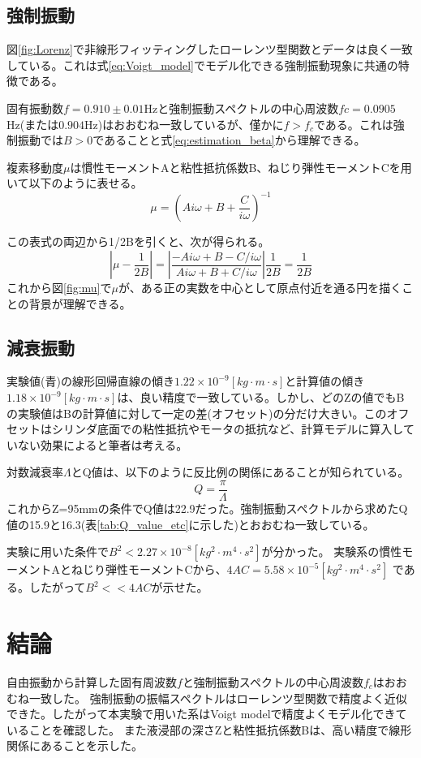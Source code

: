 \documentclass[11pt,a4]{jarticle}
\begin{document}
\subsection{強制振動}
図\ref{fig:Lorenz}で非線形フィッティングしたローレンツ型関数とデータは良く一致している。これは式\ref{eq:Voigt_model}でモデル化できる強制振動現象に共通の特徴である。

固有振動数$f=0.910 \pm 0.01$Hzと強制振動スペクトルの中心周波数$fc=0.0905$Hz(または$0.904$Hz)はおおむね一致しているが、僅かに$f>f_c$である。これは強制振動では$B>0$であることと式\ref{eq:estimation_beta}から理解できる。

複素移動度$\mu$は慣性モーメントAと粘性抵抗係数B、ねじり弾性モーメントCを用いて以下のように表せる。
\begin{equation}
\mu = ( Ai \omega + B + \frac{C}{i \omega} ) ^{-1} 
\label{eq:mu}
\end{equation}

この表式の両辺から1/2Bを引くと、次が得られる。
\begin{equation}
|\mu - \frac{1}{2B}| = | \frac{ - Ai \omega + B - C/i \omega}{ Ai \omega + B + C/i \omega}| \frac{1}{2B} = \frac{1}{2B} 
\label{eq:circle}
\end{equation}
これから図\ref{fig:mu}で$\mu$が、ある正の実数を中心として原点付近を通る円を描くことの背景が理解できる。

\subsection{減衰振動}
実験値(青)の線形回帰直線の傾き$1.22\times10^{-9} [kg\cdot m \cdot s]$と計算値の傾き$1.18\times10^{-9} [kg\cdot m \cdot s]$は、良い精度で一致している。しかし、どのZの値でもBの実験値はBの計算値に対して一定の差(オフセット)の分だけ大きい。このオフセットはシリンダ底面での粘性抵抗やモータの抵抗など、計算モデルに算入していない効果によると筆者は考える。

対数減衰率$\Lambda$とQ値は、以下のように反比例の関係にあることが知られている。
\begin{equation}
Q =  \frac{\pi}{\Lambda}
\label{eq:B}
\end{equation}
これからZ=95mmの条件でQ値は22.9だった。強制振動スペクトルから求めたQ値の15.9と16.3(表\ref{tab:Q_value_etc}に示した)とおおむね一致している。

実験に用いた条件で$B^2 < 2.27\times10^{-8} [kg^2 \cdot m^4 \cdot s^2] $が分かった。
実験系の慣性モーメントAとねじり弾性モーメントCから、$4AC= 5.58\times10^{-5} [kg^2 \cdot m^4 \cdot s^2]$ である。したがって$B^2<<4AC$が示せた。

\section{結論}
自由振動から計算した固有周波数$f$と強制振動スペクトルの中心周波数$f_c$はおおむね一致した。
強制振動の振幅スペクトルはローレンツ型関数で精度よく近似できた。したがって本実験で用いた系はVoigt modelで精度よくモデル化できていることを確認した。
また液浸部の深さZと粘性抵抗係数Bは、高い精度で線形関係にあることを示した。
\end{document}
